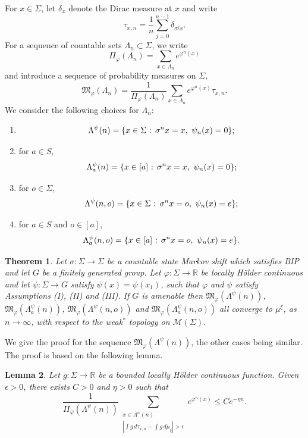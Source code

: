 \documentclass[11pt,letterpaper]{amsart}
\newtheorem{theorem}{Theorem}
\newtheorem{lemma}[theorem]{Lemma}
\theoremstyle{definition}
\numberwithin{equation}{section}
\numberwithin{theorem}{section}
\def\R{\mathbb{R}}
\def\vp{\varphi}
\def\R{\mathbb R}
\begin{document}
For $x \in \Sigma$, let $\delta_x$ denote the Dirac measure at $x$ and write
\[
\tau_{x,n} = \frac{1}{n} \sum_{j=0}^{n-1} \delta_{\sigma^jx}.
\]
For a sequence of countable sets $\Lambda_n \subset \Sigma$, we write
\[
\Pi_\vp(\Lambda_n) = \sum_{x \in \Lambda_n} e^{\vp^n(x)}
\]
and introduce a sequence of probability measures on $\Sigma$,
\[
\mathfrak M_\vp(\Lambda_n) =  \frac{1}{\Pi_\vp(\Lambda_n)} \sum_{x \in \Lambda_n} e^{\vp^n(x)} \tau_{x,n}.
\]
We consider the following choices for $\Lambda_n$:
\begin{enumerate}
\item[(1)]
\[
\Lambda^\psi(n) =\{x \in \Sigma \hbox{ : } \sigma^n x=x, \ \psi_n(x) =0\};
\]
\item[(2)]
for $a \in S$,
\[
\Lambda_a^\psi(n) =\{x \in [a] \hbox{ : } \sigma^n x=x, \ \psi_n(x) =0\};
\]
\item[(3)]
for $o \in \Sigma$,
\[
\Lambda^\psi(n,o) = \{x\in \Sigma \hbox{ : } \sigma^nx=o, \ \psi_n(x)=e\};
\]
\item [(4)]
for $a \in S$ and $o \in [a]$,
\[
 \Lambda_a^\psi(n,o) = \{x\in [a] \hbox{ : } \sigma^nx=o, \ \psi_n(x)=e\}.
 \]
\end{enumerate}


\begin{theorem}\label{th:equi_for_G}
Let $\sigma : \Sigma \to \Sigma$ be a countable state Markov shift which satisfies BIP
and let $G$ be a finitely generated group. Let $\vp : \Sigma \to \R$ be locally H\"older continuous 
and let $\psi : \Sigma \to G$
satisfy $\psi(x)=\psi(x_1)$, such that $\vp$ and $\psi$ satisfy Assumptions (I), (II) and (III).
If $G$ is amenable then
$\mathfrak M_\vp(\Lambda^\psi(n))$,
$\mathfrak M_\vp(\Lambda_a^\psi(n))$,
$\mathfrak M_\vp(\Lambda^\psi(n,o))$ and
$\mathfrak M_\vp(\Lambda_a^\psi(n,o))$
all converge to $\mu^\xi$, as $n \to \infty$,
with respect to the weak$^*$ topology on $\mathcal M(\Sigma)$.
\end{theorem}


We give the proof for the sequence $\mathfrak M_\vp(\Lambda^\psi(n))$,
the other cases being similar. The proof is based on the following lemma.

\begin{lemma}\label{lem:ld_estimate}
Let $g : \Sigma \to \R$ be a bounded locally H\"older continuous function.
Given $\epsilon>0$, there exists $C>0$ and $\eta>0$ such that
\[
\frac{1}{\Pi_\vp(\Lambda^\psi(n))} \sum_{\substack{x \in \Lambda^\psi(n) \\
|\int g \, d\tau_{x,n} -\int g \, d\mu_\xi|>\epsilon}}
e^{\vp^n(x)} \le Ce^{-\eta n}.
\]
\end{lemma}
\end{document}
